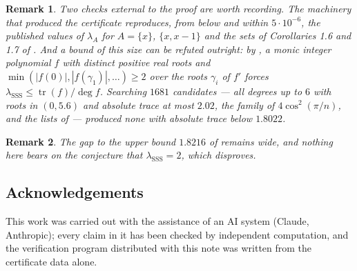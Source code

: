 \documentclass[11pt,a4paper]{article}
\newtheorem{remark}{Remark}
\newcommand{\lsss}{\lambda_{\mathrm{SSS}}}
\begin{document}
\begin{remark}
Two checks external to the proof are worth recording. The machinery that
produced the certificate reproduces, from below and within $5\cdot10^{-6}$, the
published values of $\lambda_A$ for $A=\{x\}$, $\{x,x-1\}$ and the sets of
Corollaries 1.6 and 1.7 of \cite{OTS}. And a bound of this size can be refuted
outright: by \cite[\S5]{MS}, a monic integer polynomial $f$ with distinct
positive real roots and $\min(|f(0)|,|f(\gamma_1)|,\dots)\ge 2$ over the roots
$\gamma_i$ of $f'$ forces $\lsss\le\operatorname{tr}(f)/\deg f$. Searching
$1681$ candidates --- all degrees up to $6$ with roots in $(0,5.6)$ and absolute
trace at most $2.02$, the family of $4\cos^2(\pi/n)$, and the lists of
\cite{Fla,McK,MS} --- produced none with absolute trace below $1.8022$.
\end{remark}

\begin{remark}
The gap to the upper bound $1.8216$ of \cite{OT} remains wide, and nothing here
bears on the conjecture that $\lsss=2$, which \cite{Smi} disproves.
\end{remark}

\subsection*{Acknowledgements}

This work was carried out with the assistance of an AI system (Claude,
Anthropic); every claim in it has been checked by independent computation, and
the verification program distributed with this note was written from the
certificate data alone.
\end{document}

